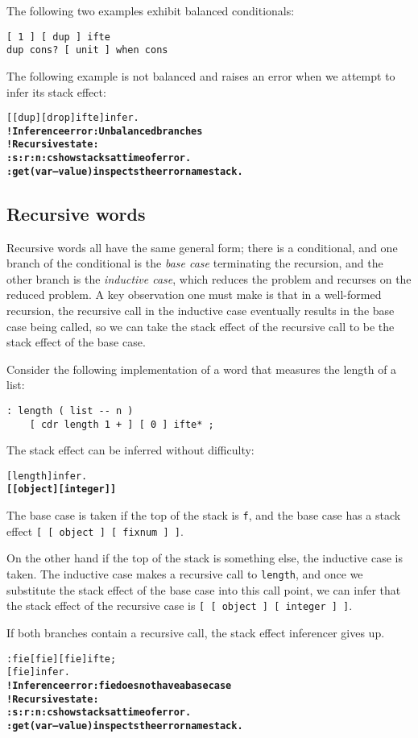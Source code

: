 \documentclass{book}
\begin{document}
The following two examples exhibit balanced conditionals:
\begin{verbatim}
[ 1 ] [ dup ] ifte
dup cons? [ unit ] when cons
\end{verbatim}
The following example is not balanced and raises an error when we attempt to infer its stack effect:
\begin{alltt}
  [ [ dup ] [ drop ] ifte ] infer .
\textbf{! Inference error: Unbalanced branches
! Recursive state:
:s :r :n :c show stacks at time of error.
:get ( var -- value ) inspects the error namestack.}
\end{alltt}

\subsection{Recursive words}

Recursive words all have the same general form; there is a conditional, and one branch of the conditional is the \emph{base case} terminating the recursion, and the other branch is the \emph{inductive case}, which reduces the problem and recurses on the reduced problem. A key observation one must make is that in a well-formed recursion, the recursive call in the inductive case eventually results in the base case being called, so we can take the stack effect of the recursive call to be the stack effect of the base case.

Consider the following implementation of a word that measures the length of a list:
\begin{verbatim}
: length ( list -- n )
    [ cdr length 1 + ] [ 0 ] ifte* ;
\end{verbatim}
The stack effect can be inferred without difficulty:
\begin{alltt}
  [ length ] infer .
\textbf{[ [ object ] [ integer ] ]}
\end{alltt}
The base case is taken if the top of the stack is \verb|f|, and the base case has a stack effect \verb|[ [ object ] [ fixnum ] ]|.

On the other hand if the top of the stack is something else, the inductive case is taken. The inductive case makes a recursive call to \verb|length|, and once we substitute the stack effect of the base case into this call point, we can infer that the stack effect of the recursive case is \verb|[ [ object ] [ integer ] ]|.

If both branches contain a recursive call, the stack effect inferencer gives up.
\begin{alltt}
  : fie [ fie ] [ fie ] ifte ;
  [ fie ] infer .
\textbf{! Inference error: fie does not have a base case
! Recursive state:
:s :r :n :c show stacks at time of error.
:get ( var -- value ) inspects the error namestack.}
\end{alltt}
\end{document}
